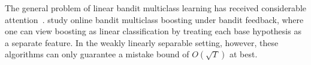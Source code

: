 

The general problem of linear bandit multiclass learning has received considerable attention~\cite{Abernethy-Rakhlin-2009, Wang-Jin-Valizadegan-2010,
Crammer-Gentile-2013, Hazan-Kale-2011, Beygelzimer-Orabona-Zhang-2017,
Foster-Kale-Luo-Mohri-Sridharan-2018}. \citet{Chen-Lin-Lu-2014,
Zhang-Jung-Tewari-2018} study online bandit multiclass boosting under bandit
feedback, where one can view boosting as linear classification by treating each
base hypothesis as a separate feature.  
In the weakly linearly separable setting, however, 
these algorithms can only guarantee a mistake 
bound of ${O}(\sqrt{T})$ at best.


